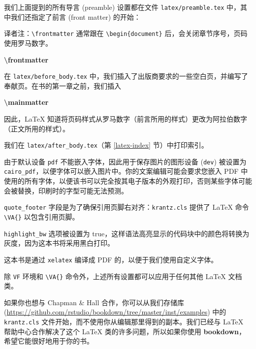 \documentclass[
  12pt,
]{krantz}
\newenvironment{Shaded}{\begin{snugshade}}{\end{snugshade}}
\newcommand{\FunctionTok}[1]{\textcolor[rgb]{0.13,0.29,0.53}{\textbf{#1}}}
\renewenvironment{quote}{\begin{VF}}{\end{VF}}
\theoremstyle{definition}
\theoremstyle{definition}
\theoremstyle{definition}
\theoremstyle{definition}
\theoremstyle{remark}
\begin{document}
我们上面提到的所有导言 (preamble) 设置都在文件 \texttt{latex/preamble.tex} 中，其中我们还指定了前言 (front matter) 的开始：

\begin{quote}
译者注：\texttt{\textbackslash{}frontmatter} 通常跟在 \texttt{\textbackslash{}begin\{document\}} 后，会关闭章节序号，页码使用罗马数字。
\end{quote}

\begin{Shaded}
\begin{Highlighting}[]
\FunctionTok{\textbackslash{}frontmatter}
\end{Highlighting}
\end{Shaded}

在 \texttt{latex/before\_body.tex} 中，我们插入了出版商要求的一些空白页，并编写了奉献页。在书的第一章之前，我们插入

\begin{Shaded}
\begin{Highlighting}[]
\FunctionTok{\textbackslash{}mainmatter}
\end{Highlighting}
\end{Shaded}

因此，LaTeX 知道将页码样式从罗马数字（前言所用的样式）更改为阿拉伯数字（正文所用的样式）。

我们在 \texttt{latex/after\_body.tex}（第 \ref{latex-index} 节）中打印索引。

由于默认设备 \texttt{pdf} 不能嵌入字体，因此用于保存图片的图形设备 (\texttt{dev}) 被设置为 \texttt{cairo\_pdf}，以便字体可以嵌入图片中。你的文案编辑可能会要求您嵌入 PDF 中使用的所有字体，以便该书可以完全按其电子版本的外观打印，否则某些字体可能会被替换，印刷时的字型可能无法预测。

\texttt{quote\_footer} 字段是为了确保引用页脚右对齐：\texttt{krantz.cls} 提供了 LaTeX 命令 \texttt{\textbackslash{}VA\{\}} 以包含引用页脚。

\texttt{highlight\_bw} 选项被设置为 true，这样语法高亮显示的代码块中的颜色将转换为灰度，因为这本书将采用黑白打印。

这本书是通过 \texttt{xelatex} 编译成 PDF 的，以便于我们使用自定义字体。

除 \texttt{VF} 环境和 \texttt{\textbackslash{}VA\{\}} 命令外，上述所有设置都可以应用于任何其他 LaTeX 文档类。

如果你也想与 Chapman \& Hall 合作，你可以从我们存储库 (\url{https://github.com/rstudio/bookdown/tree/master/inst/examples}) 中的 \texttt{krantz.cls} 文件开始，而不使用你从编辑那里得到的副本。我们已经与 LaTeX 帮助中心合作解决了这个 LaTeX 类的许多问题，所以如果你使用 \textbf{bookdown}，希望它能很好地用于你的书。
\end{document}
